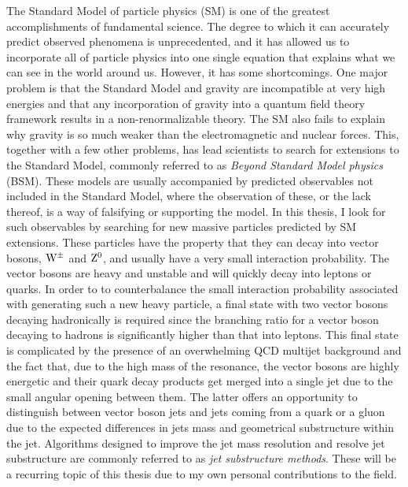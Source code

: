 \noindent The Standard Model of particle physics (SM) is one of the greatest accomplishments of fundamental science. The degree to which it can accurately predict observed phenomena is unprecedented, and it has allowed us to incorporate all of particle physics into one single equation that explains what we can see in the world around us. However, it has some shortcomings. One major problem is that the Standard Model and gravity are incompatible at very high energies and that any incorporation of gravity into a quantum field theory framework results in a non-renormalizable theory. The SM also fails to explain why gravity is so much weaker than the electromagnetic and nuclear forces. This, together with a few other problems, has lead scientists to search for extensions to the Standard Model, commonly referred to as \emph{Beyond Standard Model physics} (BSM). These models are usually accompanied by predicted observables not included in the Standard Model, where the observation of these, or the lack thereof, is a way of falsifying or supporting the model.
\newline
\newline
In this thesis, I look for such observables by searching for new massive particles predicted by SM extensions. These particles have the property that they can decay into vector bosons, $\mathrm{W}^{\pm}$ and $\mathrm{Z}^{0}$, and usually have a very small interaction probability. The vector bosons are heavy and unstable and will quickly decay into leptons or quarks. In order to to counterbalance the small interaction probability associated with generating such a new heavy particle, a final state with two vector bosons decaying hadronically is required since the branching ratio for a vector boson decaying to hadrons is significantly higher than that into leptons. This final state is complicated by the presence of an overwhelming QCD multijet background and the fact that, due to the high mass of the resonance, the vector bosons are highly energetic and their quark decay products get merged into a single jet due to the small angular opening between them. The latter offers an opportunity to distinguish between vector boson jets and jets coming from a quark or a gluon due to the expected differences in jets mass and geometrical substructure within the jet. Algorithms designed to improve the jet mass resolution and resolve jet substructure are commonly referred to as \emph{jet substructure methods}. These will be a recurring topic of this thesis due to my own personal contributions to the field.
\newline
